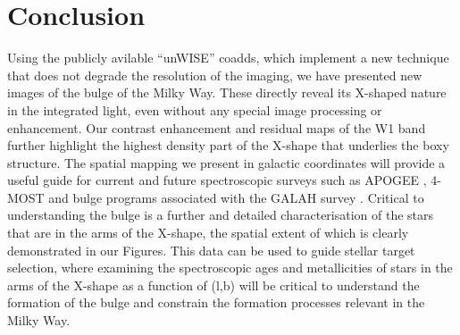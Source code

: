 \documentclass[12pt, preprint]{aastex}
\begin{document}
\section{Conclusion}

Using the publicly avilable ``unWISE'' coadds, which implement a new technique that does not degrade the resolution of the imaging, we have presented new images of the bulge of the Milky Way. These directly reveal its X-shaped nature in the integrated light, even without any special image processing or enhancement. Our contrast enhancement and residual maps of the W1 band further highlight the highest density part of the X-shape that underlies the boxy structure. The spatial mapping we present in galactic coordinates will provide a useful guide for current and future spectroscopic surveys such as APOGEE \citep{Majewski2015}, 4-MOST \citep{4most} and bulge programs associated with the GALAH survey \citep{deSilva2015}. Critical to understanding the bulge is a further and detailed characterisation of the stars that are in the arms of the X-shape, the spatial extent of which is clearly demonstrated in our Figures. This data can be used to guide stellar target selection, where examining the spectroscopic ages \citep[e.g.][]{Martig2016, Ness2016} and metallicities of stars in the arms of the X-shape as a function of (l,b) will be critical to understand the formation of the bulge and constrain the formation processes relevant in the Milky Way. 



\end{document}
